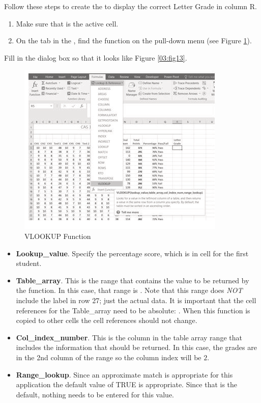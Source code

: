 Follow these steps to create the  to display the correct Letter Grade in column R.

\begin{enumerate}
	\item Make sure that  is the active cell.
	\item On the  tab in the , find the  function on the  pull-down menu (see Figure \ref{03:fig12}).
\end{enumerate}

Fill in the dialog box so that it looks like Figure \ref{03:fig13}.

\begin{figure}[H]
	\centering
	\includegraphics[width=\maxwidth{.95\linewidth}]{gfx/ch03_fig12}
	\caption{VLOOKUP Function}
	\label{03:fig12}
\end{figure}

\begin{itemize}
	\item \textbf{Lookup\_value}. Specify the percentage score, which is in cell  for the first student.
	\item \textbf{Table\_array}. This is the range that contains the value to be returned by the function. In this case, that range is . Note that this range does \textit{NOT} include the label in row 27; just the actual data. It is important that the cell references for the Table\_array need to be absolute: . When this function is copied to other cells the cell references should not change.
	\item \textbf{Col\_index\_number}. This is the column in the table array range that includes the information that should be returned. In this case, the grades are in the 2nd column of the range so the column index will be $ 2 $.
	\item \textbf{Range\_lookup}. Since an approximate match is appropriate for this application the default value of TRUE is appropriate. Since that is the default, nothing needs to be entered for this value. 
\end{itemize}

